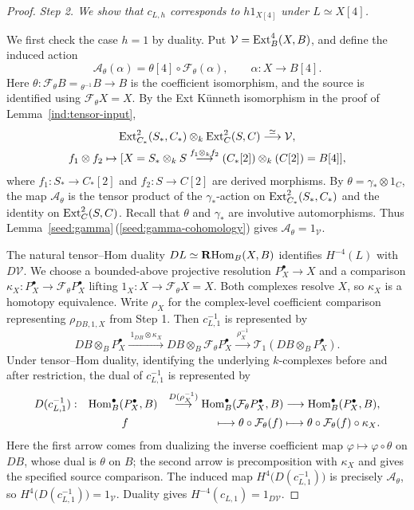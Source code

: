 \documentclass[11pt]{article}
\begin{document}
\begin{proof}
\smallskip
\noindent\emph{Step 2. We show that $c_{L,h}$ corresponds to $h1_{X[4]}$ under $L\simeq X[4]$.}
\par\nobreak\smallskip\nobreak
\noindent
We first check the case $h=1$ by duality.
Put $\mathcal V={\rm Ext}_B^4(X,B)$, and define the induced action
\[
 \mathcal A_\theta(\alpha)
 =\theta[4]\circ\mathcal F_\theta(\alpha),
 \qquad\alpha:X\longrightarrow B[4].
\]
Here $\theta:\mathcal F_\theta B={_{\theta^{-1}}B}\to B$ is the coefficient
isomorphism, and the source is identified using
$\mathcal F_\theta X=X$. By the Ext K\"unneth
isomorphism in the proof of Lemma~\ref{ind:tensor-input},
\[
\begin{gathered}
{\rm Ext}^2_{C_*}(S_*, C_*)\otimes_k{\rm Ext}^2_C(S, C)\stackrel{\simeq}{\longrightarrow} \mathcal V,\\
f_1\otimes f_2\mapsto [X=S_*\otimes_k S\stackrel{f_1\otimes_k f_2}{\longrightarrow} (C_*[2])\otimes_k (C[2])=B[4]],
\end{gathered}
\]
where $f_1: S_*\to C_*[2]$ and $f_2: S\to C[2]$ are derived morphisms. By $\theta=\gamma_*\otimes 1_C$, the map $\mathcal A_\theta$ is the tensor product of the $\gamma_*$-action on ${\rm Ext}_{C_*}^2(S_*,C_*)$ and the identity on ${\rm Ext}_C^2(S,C)$. Recall that $\theta$ and $\gamma_*$ are involutive automorphisms.
Thus  Lemma~\ref{seed:gamma}\,\textup{(\ref{seed:gamma-cohomology})} gives $\mathcal A_\theta=1_{\mathcal V}$.

The natural tensor--Hom duality $DL\simeq\mathbf R{\rm Hom}_B(X,B)$ identifies $H^{-4}(L)$ with
$D\mathcal V$. We choose a bounded-above projective resolution
$P_X^\bullet\to X$ and a comparison
$\kappa_X:P_X^\bullet\to\mathcal F_\theta P_X^\bullet$ lifting
$1_X:X\to\mathcal F_\theta X=X$.
Both complexes resolve $X$, so $\kappa_X$ is a homotopy equivalence.
Write $\rho_X$ for the complex-level coefficient comparison
representing $\rho_{DB,1,X}$ from Step 1. Then $c_{L,1}^{-1}$ is
represented by
\[
 DB\otimes_BP_X^\bullet
 \xrightarrow{\ 1_{DB}\otimes\kappa_X\ }
 DB\otimes_B\mathcal F_\theta P_X^\bullet
 \xrightarrow{\ \rho_X^{-1}\ }
 \mathcal T_1(DB\otimes_BP_X^\bullet).
\]
Under tensor--Hom duality, identifying the underlying $k$-complexes
before and after restriction, the dual of $c_{L,1}^{-1}$ is represented by
\[
\begin{aligned}
  D(c_{L,1}^{-1}):\quad &
  {\rm Hom}_B^\bullet(P_X^\bullet,B)
 &\stackrel{D(\rho_X^{-1})}{\longrightarrow}{\rm Hom}_B^\bullet(\mathcal F_\theta P_X^\bullet,B)
 \longrightarrow{\rm Hom}_B^\bullet(P_X^\bullet,B),\\
&\quad\qquad f&\longmapsto\theta\circ\mathcal F_\theta(f)
 \longmapsto\theta\circ\mathcal F_\theta(f)\circ\kappa_X.
 \end{aligned}
\]
Here the first arrow comes from dualizing the inverse coefficient
map $\varphi\mapsto\varphi\circ\theta$ on $DB$, whose dual is $\theta$
on $B$; the second arrow is precomposition with $\kappa_X$ and gives
the specified source comparison. The induced map
$H^4\bigl(D(c_{L,1}^{-1})\bigr)$ is precisely $\mathcal A_\theta$,
so $H^4\bigl(D(c_{L,1}^{-1})\bigr)=1_{\mathcal V}$.
Duality gives $H^{-4}(c_{L,1})=1_{D\mathcal V}$.


\end{proof}
\end{document}
